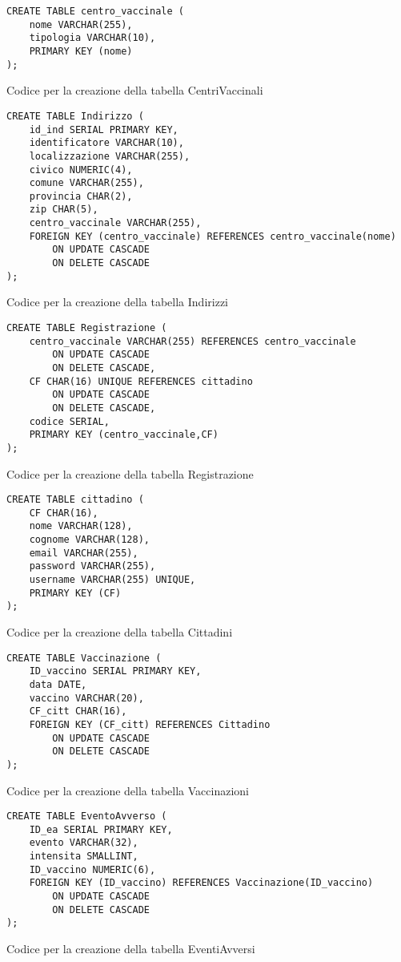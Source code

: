 \begin{listing}[h]
	\begin{verbatim}
CREATE TABLE centro_vaccinale (
	nome VARCHAR(255),
	tipologia VARCHAR(10),
	PRIMARY KEY (nome)
);
	\end{verbatim}
\caption{Codice per la creazione della tabella CentriVaccinali}
\end{listing}

\begin{listing}[h]
	\begin{verbatim}
CREATE TABLE Indirizzo (
	id_ind SERIAL PRIMARY KEY,
	identificatore VARCHAR(10),
	localizzazione VARCHAR(255),
	civico NUMERIC(4),
	comune VARCHAR(255),
	provincia CHAR(2),
	zip CHAR(5),
	centro_vaccinale VARCHAR(255),
	FOREIGN KEY (centro_vaccinale) REFERENCES centro_vaccinale(nome)
		ON UPDATE CASCADE
		ON DELETE CASCADE
);
	\end{verbatim}
\caption{Codice per la creazione della tabella Indirizzi}
\end{listing}

\begin{listing}[h]
	\begin{verbatim}
CREATE TABLE Registrazione (
	centro_vaccinale VARCHAR(255) REFERENCES centro_vaccinale
		ON UPDATE CASCADE
		ON DELETE CASCADE,
	CF CHAR(16) UNIQUE REFERENCES cittadino
		ON UPDATE CASCADE
		ON DELETE CASCADE,
	codice SERIAL,
	PRIMARY KEY (centro_vaccinale,CF)
);
	\end{verbatim}
\caption{Codice per la creazione della tabella Registrazione}
\end{listing}

\begin{listing}[h]
	\begin{verbatim}
CREATE TABLE cittadino (
	CF CHAR(16),
	nome VARCHAR(128),
	cognome VARCHAR(128),
	email VARCHAR(255),
	password VARCHAR(255),
	username VARCHAR(255) UNIQUE,
	PRIMARY KEY (CF)
);
	\end{verbatim}
\caption{Codice per la creazione della tabella Cittadini}
\end{listing}

\begin{listing}[h]
	\begin{verbatim}
CREATE TABLE Vaccinazione (
	ID_vaccino SERIAL PRIMARY KEY,
	data DATE,
	vaccino VARCHAR(20),
	CF_citt CHAR(16),
	FOREIGN KEY (CF_citt) REFERENCES Cittadino
		ON UPDATE CASCADE
		ON DELETE CASCADE
);
	\end{verbatim}
\caption{Codice per la creazione della tabella Vaccinazioni}
\end{listing}

\begin{listing}[h]
	\begin{verbatim}
CREATE TABLE EventoAvverso (
	ID_ea SERIAL PRIMARY KEY,
	evento VARCHAR(32),
	intensita SMALLINT,
	ID_vaccino NUMERIC(6),
	FOREIGN KEY (ID_vaccino) REFERENCES Vaccinazione(ID_vaccino)
		ON UPDATE CASCADE
		ON DELETE CASCADE
);
	\end{verbatim}
\caption{Codice per la creazione della tabella EventiAvversi}
\end{listing}